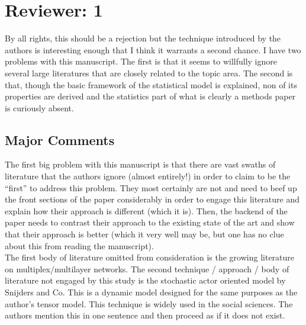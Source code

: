 \section{Reviewer: 1}

By all rights, this should be a rejection but the technique introduced by the authors is interesting enough that I think it warrants a second chance. I have two problems with this manuscript. The first is that it seems to willfully ignore several large literatures that are closely related to the topic area. The second is that, though the basic framework of the statistical model is explained, non of its properties are derived and the statistics part of what is clearly a methods paper is curiously absent.

\subsection{Major Comments}

The first big problem with this manuscript is that there are vast swaths of literature that the authors ignore (almost entirely!) in order to claim to be the ``first'' to address this problem. They most certainly are not and need to beef up the front sections of the paper considerably in order to engage this literature and explain how their approach is different (which it is). Then, the backend of the paper needs to contrast their approach to the existing state of the art and show that their approach is better (which it very well may be, but one has no clue about this from reading the manuscript). \\

The first body of literature omitted from consideration is the growing literature on multiplex/multilayer networks. The second technique / approach / body of literature not engaged by this study is the stochastic actor oriented model by Snijders and Co. This is a dynamic model designed for the same purposes as the author's tensor model. This technique is widely used in the social sciences. The authors mention this in one sentence and then proceed as if it does not exist.



